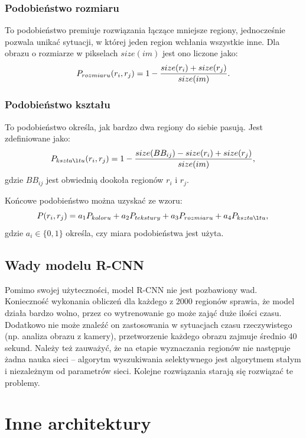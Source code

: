 \documentclass[a4paper,twoside,12pt]{book}
\begin{document}
{{}
\subsubsection{Podobieństwo rozmiaru}
{To podobieństwo premiuje rozwiązania łączące mniejsze regiony, jednocześnie pozwala unikać sytuacji, w której jeden region wchłania wszystkie inne. Dla obrazu o rozmiarze w pikselach $size(im)$ jest ono liczone jako:
\begin{equation}
P_{rozmiaru}(r_{i},r_{j})= 1- \frac{size(r_{i})+size(r_{j})}{size(im)}.\\
\end{equation}}
\subsubsection{Podobieństwo kształu}
{To podobieństwo określa, jak bardzo dwa regiony do siebie pasują. Jest zdefiniowane jako:
\begin{equation}
P_{kształtu}(r_{i},r_{j})= 1- \frac{size(BB_{ij})- size(r_{i})+size(r_{j})}{size(im)},\\
\end{equation}
gdzie $BB_{ij}$ jest obwiednią dookoła regionów $r_{i}$ i $r_{j}$.
}


{Końcowe podobieństwo można uzyskać ze wzoru:
\begin{equation}
P(r_{i},r_{j})= a_{1}P_{koloru}+a_{2}P_{tekstury}+a_{3}P_{rozmiaru}+a_{4}P_{kształtu},\\
\end{equation}
gdzie $a_{i} \in  \{0,1\}$ określa, czy miara podobieństwa jest użyta.
}


\subsection{Wady modelu R-CNN}
{Pomimo swojej użyteczności, model R-CNN nie jest pozbawiony wad. Konieczność wykonania obliczeń dla każdego z 2000 regionów sprawia, że model działa bardzo wolno, przez co wytrenowanie go może zająć duże ilości czasu. Dodatkowo nie może znaleźć on zastosowania w sytuacjach czasu rzeczywistego (np. analiza obrazu z kamery), przetworzenie każdego obrazu zajmuje średnio 40 sekund. Należy też zauważyć, że na etapie wyznaczania regionów nie następuje żadna nauka sieci  –  algorytm wyszukiwania selektywnego jest algorytmem stałym i niezależnym od parametrów sieci. Kolejne rozwiązania starają się rozwiązać te problemy. }
\section{Inne architektury}
}
\end{document}
